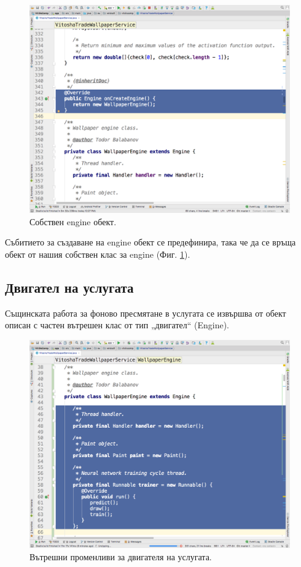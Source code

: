 \documentclass[book,14pt,oneside,openany]{memoir}
\begin{document}
\begin{figure}[h]
  \centering
  \includegraphics[height=0.45\pdfpageheight]{./images/pic0045.png}
  \caption{Собствен engine обект.}
\label{fig:pic0045}
\end{figure}
\FloatBarrier

Събитието за създаване на engine обект се предефинира, така че да се връща обект от нашия собствен клас за engine (Фиг. \ref{fig:pic0045}). 

\subsection{Двигател на услугата}

Същинската работа за фоново пресмятане в услугата се извършва от обект описан с частен вътрешен клас от тип „двигател“ (Engine).

\begin{figure}[h]
  \centering
  \includegraphics[height=0.45\pdfpageheight]{./images/pic0046.png}
  \caption{Вътрешни променливи за двигателя на услугата.}
\label{fig:pic0046}
\end{figure}
\FloatBarrier
\end{document}
